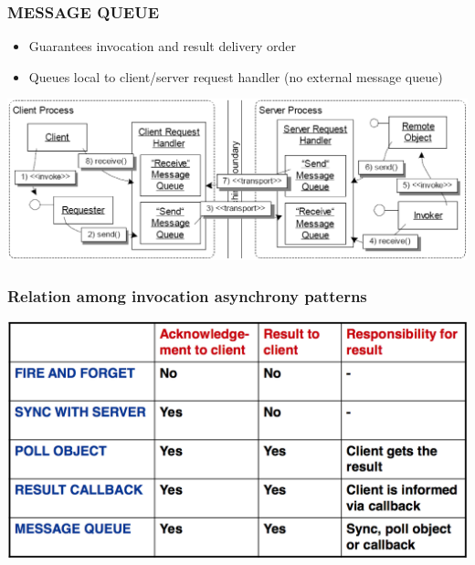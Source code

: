 \documentclass[10pt]{article}
\begin{document}
\subsubsection{MESSAGE QUEUE}
\begin{itemize}
	\item Guarantees invocation and result delivery order
	\item Queues local to client/server request handler (no external message queue)
\end{itemize}
\begin{center}
	\includegraphics[scale=0.2]{message-queue.png}
\end{center}
\subsubsection{Relation among invocation asynchrony patterns}
\begin{center}
	\includegraphics[scale=0.2]{asynchrony-pattern-compare.png}
\end{center}
\end{document}
